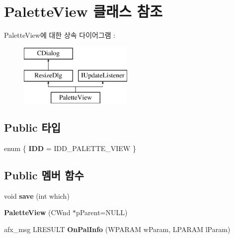 \hypertarget{class_palette_view}{}\section{Palette\+View 클래스 참조}
\label{class_palette_view}
Palette\+View에 대한 상속 다이어그램 \+: \begin{figure}[H]
\begin{center}
\leavevmode
\includegraphics[height=3.000000cm]{class_palette_view}
\end{center}
\end{figure}
\subsection*{Public 타입}
\begin{DoxyCompactItemize}
\item 
\mbox{\label{class_palette_view_ac9e3b15a860a96ff9e01c7eb81030460}} 
enum \{ {\bfseries I\+DD} = I\+D\+D\+\_\+\+P\+A\+L\+E\+T\+T\+E\+\_\+\+V\+I\+EW
 \}
\end{DoxyCompactItemize}
\subsection*{Public 멤버 함수}
\begin{DoxyCompactItemize}
\item 
\mbox{\label{class_palette_view_a107b71060221c9d44bdf0d38ca77c689}} 
void {\bfseries save} (int which)
\item 
\mbox{\label{class_palette_view_afee218ccd679f4feecc362a8c2763729}} 
{\bfseries Palette\+View} (C\+Wnd $\ast$p\+Parent=N\+U\+LL)
\item 
\mbox{\label{class_palette_view_a458786a4c3317411b5cd818c544ea50a}} 
afx\+\_\+msg L\+R\+E\+S\+U\+LT {\bfseries On\+Pal\+Info} (W\+P\+A\+R\+AM w\+Param, L\+P\+A\+R\+AM l\+Param)
\end{DoxyCompactItemize}
